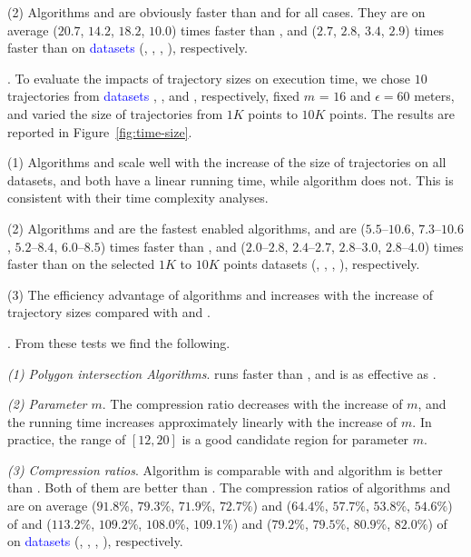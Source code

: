 \ni(2) Algorithms \cist and \cista are obviously faster than \dps and \squishe for all cases.
They are on average ($20.7$, $14.2$, $18.2$, $10.0$) times faster than \dps, and ($2.7$, $2.8$, $3.4$, {$2.9$}) times faster than \squishe on \textcolor{blue}{datasets} (\truck, \sercar, {\geolife}, \pricar), respectively.


.
To evaluate the impacts of trajectory sizes on execution time,
we chose {$10$} trajectories from \textcolor{blue}{datasets} \truck, \sercar, \geolife and \pricar, respectively,
fixed $m$ = $16$ and $\epsilon = 60$ meters, and varied the size  of trajectories from $1K$ points to $10K$ points.
%
The results are reported in Figure~\ref{fig:time-size}.

\ni(1) Algorithms \cist and \cista scale well with the increase of the size of trajectories on all datasets,
and both have a linear running time, while algorithm \dps does not.
This is consistent with their time complexity analyses.

\ni(2) Algorithms \cist and \cista are the fastest \sed enabled \lsa algorithms, and are {($5.5$--$10.6$, $7.3$--$10.6$, $5.2$--$8.4$, $6.0$--$8.5$)} times faster than \dps,
and {($2.0$--$2.8$, $2.4$--$2.7$, $2.8$--$3.0$, $2.8$--$4.0$)} times faster than \squishe on the selected $1K$ to $10K$ points datasets (\truck, \sercar, \geolife, \pricar), respectively.

\ni(3) The efficiency advantage of algorithms \cist and \cista increases with the increase of trajectory sizes compared with \dps and \squishe.



.
From these tests we find the following.

\sstab \emph{(1) Polygon intersection Algorithms}. \rpia runs faster than \cpia, and is as effective as \cpia.

\sstab\emph{(2) Parameter $m$}. The compression ratio decreases with the increase of $m$, and the running time increases approximately linearly with the increase of $m$. In practice, the range of $[12, 20]$ is a good candidate region for parameter $m$.

\sstab\emph{(3) Compression ratios}. Algorithm \cist is comparable with \dps and algorithm \cista is better than \dps.
Both of them are better than \squishe.
The compression ratios of algorithms \cist and \cista are on average ($91.8\%$, $79.3\%$, $71.9\%$, {$72.7\%$}) and ($64.4\%$, $57.7\%$, $53.8\%$, {$54.6\%$}) of \squishe and ($113.2\%$, $109.2\%$, $108.0\%$, $109.1\%$) and ($79.2\%$, $79.5\%$, $80.9\%$, $82.0\%$) of \dps on \textcolor{blue}{datasets} (\truck, \sercar, \geolife, \pricar), respectively.


